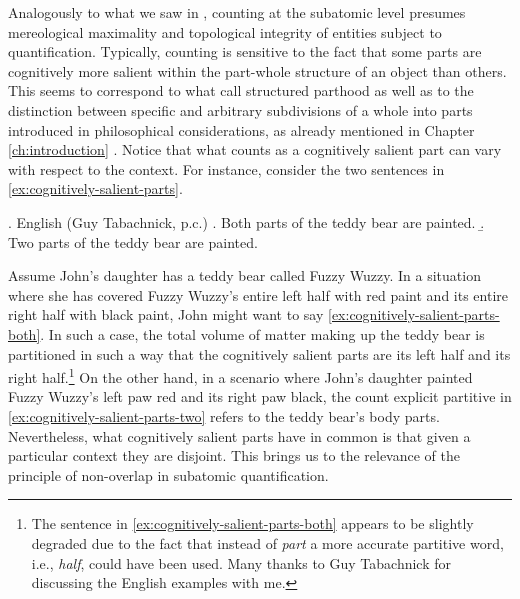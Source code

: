 Analogously to what we saw in , counting at the subatomic level presumes mereological maximality and topological integrity of entities subject to quantification. Typically, counting is sensitive to the fact that some parts are cognitively more salient within the part-whole structure of an object than others. This seems to correspond to what \citet{champollion_krifka2016mereology} call structured parthood as well as to the distinction between specific and arbitrary subdivisions of a whole into parts introduced in philosophical considerations, as already mentioned in Chapter \ref{ch:introduction} \citep[e.g.,][]{krecz1986parts,markosian1998brutal,jennings2010against}. Notice that what counts as a cognitively salient part can vary with respect to the context. For instance, consider the two sentences in \ref{ex:cognitively-salient-parts}. 

\ex. English (Guy Tabachnick, p.c.)\label{ex:cognitively-salient-parts}
\a. Both parts of the teddy bear are painted.\label{ex:cognitively-salient-parts-both}
\b. Two parts of the teddy bear are painted.\label{ex:cognitively-salient-parts-two}

Assume John's daughter has a teddy bear called Fuzzy Wuzzy. In a situation where she has covered Fuzzy Wuzzy's entire left half with red paint and its entire right half with black paint, John might want to say \ref{ex:cognitively-salient-parts-both}. In such a case, the total volume of matter making up the teddy bear is partitioned in such a way that the cognitively salient parts are its left half and its right half.\footnote{The sentence in \ref{ex:cognitively-salient-parts-both} appears to be slightly degraded due to the fact that instead of \textit{part} a more accurate partitive word, i.e., \textit{half}, could have been used. Many thanks to Guy Tabachnick for discussing the English examples with me.} On the other hand, in a scenario where John's daughter painted Fuzzy Wuzzy's left paw red and its right paw black, the count explicit partitive in \ref{ex:cognitively-salient-parts-two} refers to the teddy bear's body parts. Nevertheless, what cognitively salient parts have in common is that given a particular context they are disjoint. This brings us to the relevance of the principle of non-overlap in subatomic quantification.\largerpage

